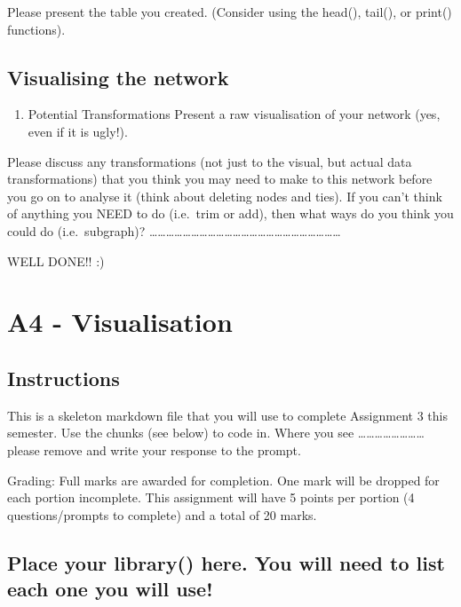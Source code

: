 \documentclass[
  letterpaper,
  DIV=11,
  numbers=noendperiod]{scrreprt}
\providecommand{\tightlist}{%
  \setlength{\itemsep}{0pt}\setlength{\parskip}{0pt}}\usepackage{longtable,booktabs,array}
\begin{document}
Please present the table you created. (Consider using the head(),
tail(), or print() functions).

\section{Visualising the network}\label{visualising-the-network}

\begin{enumerate}
\def\labelenumi{\arabic{enumi})}
\setcounter{enumi}{3}
\tightlist
\item
  Potential Transformations Present a raw visualisation of your network
  (yes, even if it is ugly!).
\end{enumerate}

Please discuss any transformations (not just to the visual, but actual
data transformations) that you think you may need to make to this
network before you go on to analyse it (think about deleting nodes and
ties). If you can't think of anything you NEED to do (i.e.~trim or add),
then what ways do you think you could do (i.e.~subgraph)?
\ldots\ldots\ldots\ldots\ldots\ldots\ldots\ldots\ldots\ldots\ldots\ldots\ldots\ldots\ldots\ldots\ldots\ldots\ldots\ldots\ldots\ldots\ldots{}

WELL DONE!! :)

\chapter{A4 - Visualisation}\label{a4---visualisation}

\section{Instructions}\label{instructions}

This is a skeleton markdown file that you will use to complete
Assignment 3 this semester. Use the chunks (see below) to code in. Where
you see \ldots\ldots\ldots\ldots\ldots\ldots\ldots\ldots{} please remove
and write your response to the prompt.

Grading: Full marks are awarded for completion. One mark will be dropped
for each portion incomplete. This assignment will have 5 points per
portion (4 questions/prompts to complete) and a total of 20 marks.

\section{Place your library() here. You will need to list each one you
will
use!}\label{place-your-library-here.-you-will-need-to-list-each-one-you-will-use}
\end{document}
